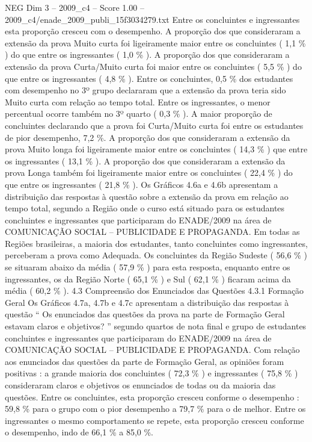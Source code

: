 \begin{textsample}{NEG Dim 3 – 2009\_c4 – Score 1.00 – 2009\_c4/enade\_2009\_publi\_15f3034279.txt}
Entre os concluintes e ingressantes esta proporção cresceu com o desempenho.
A proporção dos que consideraram a extensão da prova Muito curta foi ligeiramente maior entre os concluintes ( 1,1 \% ) do que entre os ingressantes ( 1,0 \% ).
A proporção dos que consideraram a extensão da prova Curta/Muito curta foi maior entre os concluintes ( 5,5 \% ) do que entre os ingressantes ( 4,8 \% ).
Entre os concluintes, 0,5 \% dos estudantes com desempenho no 3º grupo declararam que a extensão da prova teria sido Muito curta com relação ao tempo total.
Entre os ingressantes, o menor percentual ocorre também no 3º quarto ( 0,3 \% ).
A maior proporção de concluintes declarando que a prova foi Curta/Muito curta foi entre os estudantes de pior desempenho, 7,2 \%.
A proporção dos que consideraram a extensão da prova Muito longa foi ligeiramente maior entre os concluintes ( 14,3 \% ) que entre os ingressantes ( 13,1 \% ).
A proporção dos que consideraram a extensão da prova Longa também foi ligeiramente maior entre os concluintes ( 22,4 \% ) do que entre os ingressantes ( 21,8 \% ).
Os Gráficos 4.6a e 4.6b apresentam a distribuição das respostas à questão sobre a extensão da prova em relação ao tempo total, segundo a Região onde o curso está situado para os estudantes concluintes e ingressantes que participaram do ENADE/2009 na área de COMUNICAÇÃO SOCIAL – PUBLICIDADE E PROPAGANDA.
Em todas as Regiões brasileiras, a maioria dos estudantes, tanto concluintes como ingressantes, perceberam a prova como Adequada.
Os concluintes da Região Sudeste ( 56,6 \% ) se situaram abaixo da média ( 57,9 \% ) para esta resposta, enquanto entre os ingressantes, os da Região Norte ( 65,1 \% ) e Sul ( 62,1 \% ) ficaram acima da média ( 60,2 \% ). 4.3 Compreensão dos Enunciados das Questões 4.3.1 Formação Geral Os Gráficos 4.7a, 4.7b e 4.7c apresentam a distribuição das respostas à questão “ Os enunciados das questões da prova na parte de Formação Geral estavam claros e objetivos? ” segundo quartos de nota final e grupo de estudantes concluintes e ingressantes que participaram do ENADE/2009 na área de COMUNICAÇÃO SOCIAL – PUBLICIDADE E PROPAGANDA.
Com relação aos enunciados das questões da parte de Formação Geral, as opiniões foram positivas : a grande maioria dos concluintes ( 72,3 \% ) e ingressantes ( 75,8 \% ) consideraram claros e objetivos os enunciados de todas ou da maioria das questões.
Entre os concluintes, esta proporção cresceu conforme o desempenho : 59,8 \% para o grupo com o pior desempenho a 79,7 \% para o de melhor.
Entre os ingressantes o mesmo comportamento se repete, esta proporção cresceu conforme o desempenho, indo de 66,1 \% a 85,0 \%.

\end{textsample}
